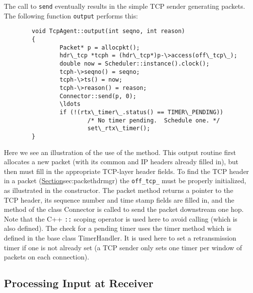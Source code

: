 The call to {\tt send} eventually results in the simple TCP sender
generating packets.
The following function {\tt output} performs this:
\begin{verbatim}
        void TcpAgent::output(int seqno, int reason)
        {
                Packet* p = allocpkt();
                hdr\_tcp *tcph = (hdr\_tcp*)p-\>access(off\_tcp\_);
                double now = Scheduler::instance().clock();
                tcph-\>seqno() = seqno;
                tcph-\>ts() = now;
                tcph-\>reason() = reason;
                Connector::send(p, 0);
                \ldots
                if (!(rtx\_timer\_.status() == TIMER\_PENDING))
                        /* No timer pending.  Schedule one. */
                        set\_rtx\_timer();
        }
\end{verbatim}
Here we see an illustration of the use of the  method.
This output routine first allocates a new packet
(with its common and IP headers already filled in), but then must fill
in the appropriate TCP-layer header fields.
To find the TCP header in a packet 
(\href{assuming it has been enabled}{Section}{sec:packethdrmgr})
the {\tt off\_tcp\_} must be properly initialized,
as illustrated in the constructor.
The packet  method returns a pointer to the TCP header,
its sequence number and time stamp fields are filled in,
and the  method of the class Connector is called
to send the packet downstream one hop.
Note that the C++ {\tt ::} scoping operator is used here to avoid
calling  (which is also defined).
The check for a pending timer uses the timer method  which
is defined in the base class TimerHandler.
It is used here to set a retransmission timer if one is not already set
(a TCP sender only sets one timer per window of packets on each connection).

\subsection{Processing Input at Receiver}
\label{sec:tcpsink}

